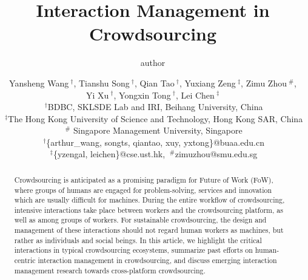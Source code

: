 \documentclass[11pt]{article}
\begin{document}
\title{Interaction Management in Crowdsourcing}
\author{author}

\author{
		Yansheng Wang{\small $~^{\dagger}$},
		Tianshu Song{\small $~^{\dagger}$},
		Qian Tao{\small $~^{\dagger}$},
		Yuxiang Zeng{\small $~^{\ddagger}$},
		Zimu Zhou{\small $~^{\#}$}, \\
		Yi Xu{\small $~^{\dagger}$},
		Yongxin Tong{\small $~^{\dagger}$},
		Lei Chen{\small $~^{\ddagger}$} \\
	$~^{\dagger}$BDBC, SKLSDE Lab and IRI, Beihang University, China\\
		$~^{\ddagger}$The Hong Kong University of Science and Technology, Hong Kong SAR, China\\
		$~^{\#}$ Singapore Management University, Singapore\\
		$~^{\dagger}$\{arthur\_wang, songts, qiantao, xuy, yxtong\}@buaa.edu.cn \\
		$~^{\ddagger}$\{yzengal, leichen\}@cse.ust.hk,
		$~^{\#}$zimuzhou@smu.edu.sg
}

\maketitle

\begin{abstract}
Crowdsourcing is anticipated as a promising paradigm for Future of Work (FoW), where groups of humans are engaged for problem-solving, services and innovation which are usually difficult for machines.
During the entire workflow of crowdsourcing, intensive interactions take place between workers and the crowdsourcing platform, as well as among groups of workers. 
For sustainable crowdsourcing, the design and management of these interactions should not regard human workers as machines, but rather as individuals and social beings. 
In this article, we highlight the critical interactions in typical crowdsourcing ecosystems, summarize past efforts on human-centric interaction management in crowdsourcing, and discuss emerging interaction management research towards cross-platform crowdsourcing.
\end{abstract}
\end{document}
